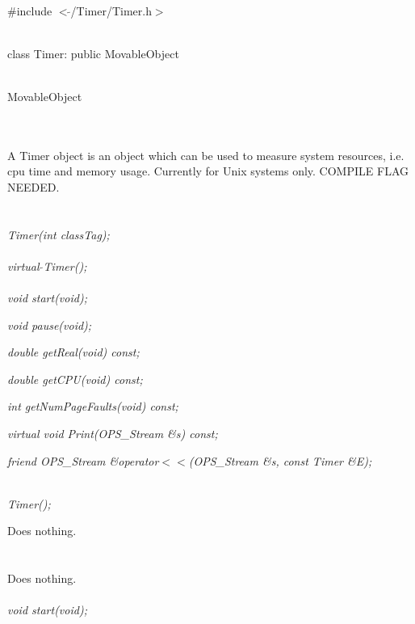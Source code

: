 
   \\
\#include $<\tilde{}$/Timer/Timer.h$>$  


  \\
class Timer: public MovableObject  


 \\
MovableObject 

\indent{} \\

  \\
\indent A Timer object is an object which can be used to measure
system resources, i.e. cpu time and memory usage. Currently for Unix
systems only. COMPILE FLAG NEEDED.\\

 \\
  \\ 
{\em Timer(int classTag);}  \\ 

  \\ 
{\em virtual $\tilde{}$Timer();} \\ 

  \\ 
{\em  void start(void);}

{\em  void pause(void);}

{\em  double getReal(void) const;}

{\em  double getCPU(void) const;}

{\em  int getNumPageFaults(void) const;}

{\em  virtual void Print(OPS_Stream \&s) const; }

{\em  friend OPS_Stream \&operator$<<$(OPS_Stream \&s, const Timer \&E); }


  \\
{\em Timer();}  

Does nothing. \\

 \\
 \\ 
Does nothing. \\

  \\
{\em  void start(void);}


